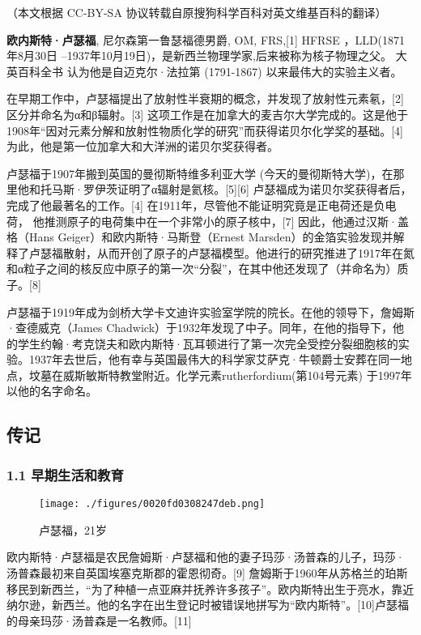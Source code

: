 
（本文根据 CC-BY-SA 协议转载自原搜狗科学百科对英文维基百科的翻译）

\textbf{欧内斯特·卢瑟福}, 尼尔森第一鲁瑟福德男爵, OM, FRS,[1] HFRSE ，LLD(1871年8月30日 –1937年10月19日)，是新西兰物理学家,后来被称为核子物理之父。 大英百科全书 认为他是自迈克尔·法拉第 (1791-1867) 以来最伟大的实验主义者。

在早期工作中，卢瑟福提出了放射性半衰期的概念，并发现了放射性元素氡，[2] 区分并命名为α和β辐射。[3] 这项工作是在加拿大的麦吉尔大学完成的。这是他于1908年“因对元素分解和放射性物质化学的研究”而获得诺贝尔化学奖的基础。[4] 为此，他是第一位加拿大和大洋洲的诺贝尔奖获得者。

卢瑟福于1907年搬到英国的曼彻斯特维多利亚大学 (今天的曼彻斯特大学)，在那里他和托马斯·罗伊茨证明了α辐射是氦核。[5][6] 卢瑟福成为诺贝尔奖获得者后，完成了他最著名的工作。[4] 在1911年，尽管他不能证明究竟是正电荷还是负电荷， 他推测原子的电荷集中在一个非常小的原子核中，[7] 因此，他通过汉斯·盖格（Hans Geiger）和欧内斯特·马斯登（Ernest Marsden）的金箔实验发现并解释了卢瑟福散射，从而开创了原子的卢瑟福模型。他进行的研究推进了1917年在氮和α粒子之间的核反应中原子的第一次“分裂”，在其中他还发现了（并命名为）质子。[8]

卢瑟福于1919年成为剑桥大学卡文迪许实验室学院的院长。在他的领导下，詹姆斯·查德威克（James Chadwick）于1932年发现了中子。同年，在他的指导下，他的学生约翰·考克饶夫和欧内斯特·瓦耳顿进行了第一次完全受控分裂细胞核的实验。1937年去世后，他有幸与英国最伟大的科学家艾萨克·牛顿爵士安葬在同一地点，坟墓在威斯敏斯特教堂附近。化学元素rutherfordium(第104号元素) 于1997年以他的名字命名。

\subsection{ 传记}
\subsubsection{1.1 早期生活和教育}
\begin{figure}[ht]
\centering
\texttt{[image: ./figures/0020fd0308247deb.png]}
\caption{卢瑟福，21岁} \label{fig_Ernest_1}
\end{figure}
欧内斯特·卢瑟福是农民詹姆斯·卢瑟福和他的妻子玛莎·汤普森的儿子，玛莎·汤普森最初来自英国埃塞克斯郡的霍恩彻奇。[9] 詹姆斯于1960年从苏格兰的珀斯移民到新西兰，“为了种植一点亚麻并抚养许多孩子”。欧内斯特出生于亮水，靠近纳尔逊，新西兰。他的名字在出生登记时被错误地拼写为“欧内斯特”。[10]卢瑟福的母亲玛莎·汤普森是一名教师。[11]

